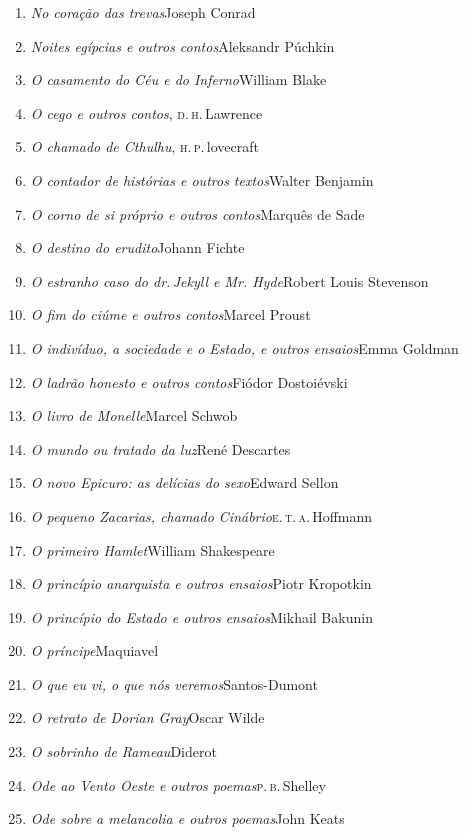 \begin{enumerate}
\item \textit{No coração das trevas}\quad Joseph Conrad
\item \textit{Noites egípcias e outros contos}\quad Aleksandr Púchkin
\item \textit{O casamento do Céu e do Inferno}\quad William Blake
\item \textit{O cego e outros contos}, \textsc{d.\,h}.\,Lawrence
\item \textit{O chamado de Cthulhu}, \textsc{h.\,p.}\,lovecraft
\item \textit{O contador de histórias e outros textos}\quad Walter Benjamin
\item \textit{O corno de si próprio e outros contos}\quad Marquês de Sade
\item \textit{O destino do erudito}\quad Johann Fichte
\item \textit{O estranho caso do dr.\,Jekyll e Mr. Hyde}\quad Robert Louis Stevenson
\item \textit{O fim do ciúme e outros contos}\quad Marcel Proust
\item \textit{O indivíduo, a sociedade e o Estado, e outros ensaios}\quad Emma Goldman
\item \textit{O ladrão honesto e outros contos}\quad Fiódor Dostoiévski
\item \textit{O livro de Monelle}\quad Marcel Schwob
\item \textit{O mundo ou tratado da luz}\quad René Descartes
\item \textit{O novo Epicuro: as delícias do sexo}\quad Edward Sellon
\item \textit{O pequeno Zacarias, chamado Cinábrio}\quad \textsc{e.\,t.\,a.}\,Hoffmann
\item \textit{O primeiro Hamlet}\quad William Shakespeare
\item \textit{O princípio anarquista e outros ensaios}\quad Piotr Kropotkin
\item \textit{O princípio do Estado e outros ensaios}\quad Mikhail Bakunin
\item \textit{O príncipe}\quad Maquiavel
\item \textit{O que eu vi, o que nós veremos}\quad Santos-Dumont
\item \textit{O retrato de Dorian Gray}\quad Oscar Wilde
\item \textit{O sobrinho de Rameau}\quad Diderot
\item \textit{Ode ao Vento Oeste e outros poemas}\quad \textsc{p.\,b.}\,Shelley
\item \textit{Ode sobre a melancolia e outros poemas}\quad John Keats

\end{enumerate}
